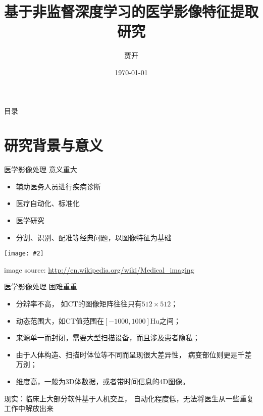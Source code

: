 \documentclass {beamer}
\title{基于非监督深度学习的医学影像特征提取研究}
\author {贾开}
\institute {清华大学}
\date{\today}
\newcommand{\addgraph}[2]{\begin{center}
\texttt{[image: \#2]}\end{center}}
\begin{document}



\begin{frame}{目录}
    \tableofcontents
\end{frame}

\section{研究背景与意义}

\begin{frame}{医学影像处理}
    \alert{意义重大}
    \begin{itemize}
        \item 辅助医务人员进行疾病诊断
        \item 医疗自动化、标准化
        \item 医学研究
        \item 分割、识别、配准等经典问题，以图像特征为基础
    \end{itemize}
    \addgraph{0.3}{res/mi-concept.jpg}
    \tiny{image source:
        \url{http://en.wikipedia.org/wiki/Medical\_imaging}}
\end{frame}

\begin{frame}{医学影像处理}
    \alert{困难重重}
    \begin{itemize}
        \item 分辨率不高，
            如CT的图像矩阵往往只有$512\times 512$；
        \item 动态范围大，如CT值范围在$[-1000,1000]$Hu之间；
        \item 来源单一而封闭，需要大型扫描设备，而且涉及患者隐私；
        \item 由于人体构造、扫描时体位等不同而呈现很大差异性，
            病变部位则更是千差万别；
        \item 维度高，一般为3D体数据，或者带时间信息的4D图像。
    \end{itemize}
    \pause
    \alert{现实：}临床上大部分软件基于人机交互，
    自动化程度低，无法将医生从一些重复工作中解放出来
\end{frame}
\end{document}

